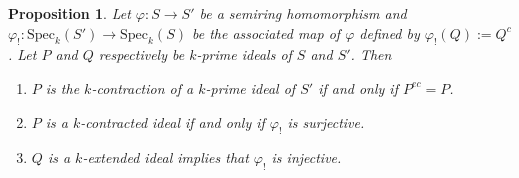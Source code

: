 \documentclass[11pt,leqno]{amsart}
\newtheorem{proposition}[theorem]{Proposition}
\theoremstyle{definition}
\numberwithin{equation}{section}
\begin{document}
\begin{proposition}\label{contraction of k-prime ideals}
Let $\varphi\colon S\to S'$ be a semiring homomorphism and $\varphi_{!} \colon \mathrm{Spec}_k(S') \to \mathrm{Spec}_k(S)$ be the associated map of $\varphi$ defined by $\varphi_!(Q):=Q^c$. Let $P$ and $Q$ respectively be $k$-prime ideals of $S$ and $S'$. Then 
\begin{enumerate}
\item $P$ is the $k$-contraction of a $k$-prime ideal of $S'$ if and only if $P^{ec}=P$.
		
\item   $P$ is a $k$-contracted ideal if and only if  $\varphi_!$ is surjective.
		
\item $Q$ is a $k$-extended ideal implies that $\varphi_!$ is injective.
\end{enumerate}
\end{proposition}
\end{document}
